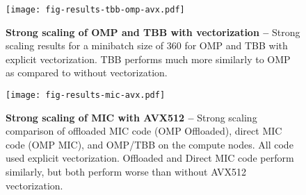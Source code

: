 
\begin{figure}[!hbt]

  \centering
  \texttt{[image: fig-results-tbb-omp-avx.pdf]}

  \caption{\textbf{Strong scaling of OMP and TBB with vectorization --} Strong scaling results for a minibatch size of 360 for OMP and TBB with explicit vectorization. TBB performs much more similarly to OMP as compared to without vectorization.}

  \label{fig-results-tbb-omp-avx}

  \centering
  \texttt{[image: fig-results-mic-avx.pdf]}

  \caption{\textbf{Strong scaling of MIC with AVX512 --} Strong scaling comparison of offloaded MIC code (OMP Offloaded), direct MIC code (OMP MIC), and OMP/TBB on the compute nodes. All code used explicit vectorization. Offloaded and Direct MIC code perform similarly, but both perform worse than without AVX512 vectorization.}

  \label{fig-results-mic-avx}

\end{figure}
